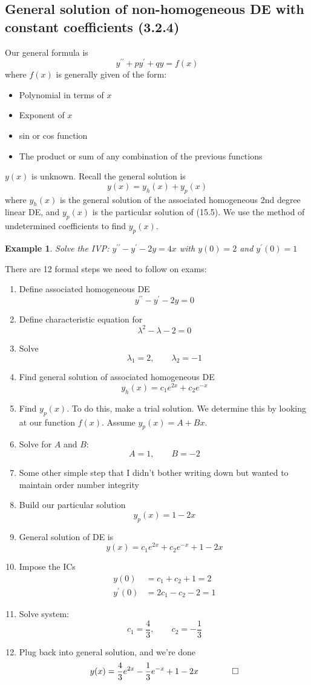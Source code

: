 \documentclass{report}
\newtheorem{ex}{Example}[section]
\begin{document}
\subsection{General solution of non-homogeneous DE with constant coefficients (3.2.4)}
Our general formula is
\begin{equation}
y^{\prime\prime} + py^\prime + qy = f(x)
\end{equation}
where $f(x)$ is generally given of the form:
\begin{itemize}
\item Polynomial in terms of $x$
\item Exponent of $x$
\item sin or cos function
\item The product or sum of any combination of the previous functions
\end{itemize} $y(x)$ is unknown. Recall the general solution is
$$y(x) = y_h(x) + y_p(x)$$
where $y_h(x)$ is the general solution of the associated homogeneous 2nd degree linear DE, and $y_p(x)$ is the particular solution of (15.5). We use the method of undetermined coefficients to find $y_p(x)$.\newpage
\begin{ex}
Solve the IVP: $y^{\prime\prime} - y^\prime -2y = 4x$ with $y(0) = 2$ and $y^\prime(0) = 1$
\end{ex}\noindent
There are 12 formal steps we need to follow on exams:
\begin{enumerate}
\item Define associated homogeneous DE
$$y^{\prime\prime} - y^\prime -2y = 0$$
\item Define characteristic equation for $$\lambda^2 - \lambda - 2 = 0$$
\item Solve
$$\lambda_1 = 2, \qquad \lambda_2 = -1$$
\item Find general solution of associated homogeneous DE
$$y_h(x) = c_1e^{2x} + c_2e^{-x}$$
\item Find $y_p(x)$. To do this, make a trial solution. We determine this by looking at our function $f(x)$. Assume $y_p(x) = A + Bx$.
\item Solve for $A$ and $B$:
$$A = 1, \qquad B=-2$$
\item Some other simple step that I didn't bother writing down but wanted to maintain order number integrity
\item Build our particular solution
$$y_p(x) = 1-2x$$
\item General solution of DE is
$$y(x) = c_1e^{2x} + c_2e^{-x} + 1 - 2x$$
\item Impose the ICs
\begin{align*}
y(0) &= c_1 + c_2 + 1 = 2 \\
y^\prime(0) &= 2c_1 - c_2 - 2 = 1
\end{align*}
\item Solve system:
$$c_1 = \frac{4}{3}, \qquad c_2 = -\frac{1}{3}$$
\item Plug back into general solution, and we're done
$$y(x) = \frac{4}{3}e^{2x} - \frac{1}{3}e^{-x} + 1 - 2x \qquad \qed$$
\end{enumerate}
\end{document}
